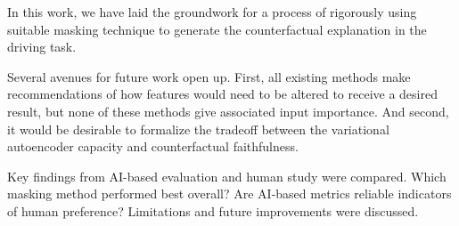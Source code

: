 In this work, we have laid the groundwork for a process of rigorously using suitable masking technique to generate the counterfactual explanation in the driving task. 




Several avenues for future work open up. First, all existing methods make recommendations of how features would need to be altered to receive a desired result, but none of these methods give associated input importance. And second, it would be desirable to formalize the tradeoff between the variational autoencoder capacity and counterfactual faithfulness.




Key findings from AI-based evaluation and human study were compared.
Which masking method performed best overall?
Are AI-based metrics reliable indicators of human preference?
Limitations and future improvements were discussed.